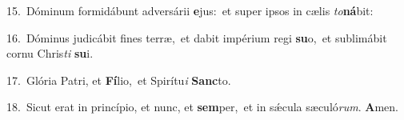 {\numbfont\textcolor{\numbcolor}{15.}}~Dóminum formidábunt adversárii \textbf{e}\-jus:~\star et super ipsos in cælis \textit{to}\-\textbf{ná}bit:\par
{\numbfont\textcolor{\numbcolor}{16.}}~Dóminus judicábit fines terræ,~\dagger et dabit impérium regi \textbf{su}\-o,~\star et sublimábit cornu Chris\textit{ti} \textbf{su}\-i.\par
{\numbfont\textcolor{\numbcolor}{17.}}~Glória Patri, et \textbf{Fí}\-lio,~\star et Spirítu\textit{i} \textbf{Sanc}\-to.\par
{\numbfont\textcolor{\numbcolor}{18.}}~Sicut erat in princípio, et nunc, et \textbf{sem}\-per,~\star et in sǽcula sæculó\-\textit{rum}\-. \textbf{A}\-men.\par
